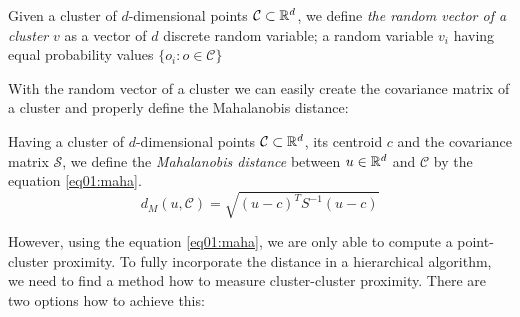 \begin{defn}
	Given a cluster of $d$-dimensional points $\mathcal{C} \subset \mathbb{R}^d$, we define \emph{the random vector of a cluster} $v$ as a vector of $d$ discrete random variable; a random variable $v_i$ having equal probability values $\{o_i:o\in \mathcal{C}\}$
\end{defn}

With the random vector of a cluster we can easily create the covariance matrix of a cluster and properly define the Mahalanobis distance:

\begin{defn}
	Having a cluster of $d$-dimensional points $\mathcal{C} \subset \mathbb{R}^d$, its centroid $c$ and the covariance matrix $\mathcal{S}$, we define the \emph{Mahalanobis distance} between $u \in \mathbb{R}^d$ and $\mathcal{C}$ by the equation \ref{eq01:maha}.
	\begin{equation}\label{eq01:maha}
	d_M(u,\mathcal{C}) = \sqrt{(u-c)^TS^{-1}(u-c)}
	\end{equation}
	\label{def01:maha}
\end{defn}


However, using the equation \ref{eq01:maha}, we are only able to compute a point-cluster proximity. To fully incorporate the distance in a hierarchical algorithm, we need to find a method how to measure cluster-cluster proximity. There are two options how to achieve this:

